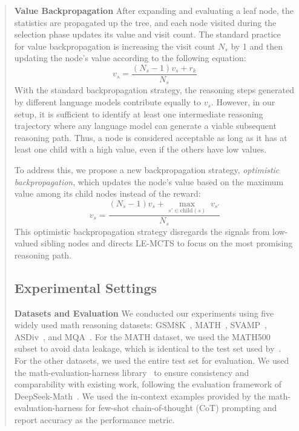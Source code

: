 \documentclass[11pt]{article}
\begin{document}
\begin{abstract}
\medskip
\par \noindent \textbf{Value Backpropagation} \;
After expanding and evaluating a leaf node, the statistics are propagated up the tree, and each node visited during the selection phase updates its value and visit count. 
The standard practice~\citep{browne-etal-2012-survey} for value backpropagation is increasing the visit count \(N_s\) by 1 and then updating the node's value according to the following equation:
\begin{equation}
    v_s = \frac{(N_s-1)v_s + r_k}{N_s}
\end{equation}
With the standard backpropagation strategy, the reasoning steps generated by different language models contribute equally to \( v_s \).
However, in our setup, it is sufficient to identify at least one intermediate reasoning trajectory where any language model can generate a viable subsequent reasoning path.
Thus, a node is considered acceptable as long as it has at least one child with a high value, even if the others have low values.

To address this, we propose a new backpropagation strategy, \textit{optimistic backpropagation}, which updates the node's value based on the maximum value among its child nodes instead of the reward:
\begin{equation}
    v_s = \frac{(N_s-1)v_s + \underset{s' \in \text{child}(s)}{\max}\; v_{s'}}{N_s}
\end{equation}
This optimistic backpropagation strategy disregards the signals from low-valued sibling nodes and directs LE-MCTS to focus on the most promising reasoning path.
 

 

\subsection{Experimental Settings}
\label{text:experiment:setting}
\par \noindent \textbf{Datasets and Evaluation} \; We conducted our experiments using five widely used math reasoning datasets: GSM8K~\citep{cobbe-etal-2021-gsm8k}, MATH~\citep{hendrycks-etal-2021-math}, SVAMP~\cite{patel-etal-2021-nlp}, ASDiv~\cite{miao-etal-2020-diverse}, and MQA~\cite{amini-etal-2019-mqa}.
For the MATH dataset, we used the MATH500 subset to avoid data leakage, which is identical to the test set used by~\citet{lightman-etal-2023-prm800k}.
For the other datasets, we used the entire test set for evaluation.
We used the math-evaluation-harness library~\cite{gou-etal-2024-harness} to ensure consistency and comparability with existing work, following the evaluation framework of DeepSeek-Math~\citep{shao-etal-2024-deepseek}.
We used the in-context examples provided by the math-evaluation-harness for few-shot chain-of-thought (CoT) prompting and report accuracy as the performance metric.


\end{abstract}
\end{document}

